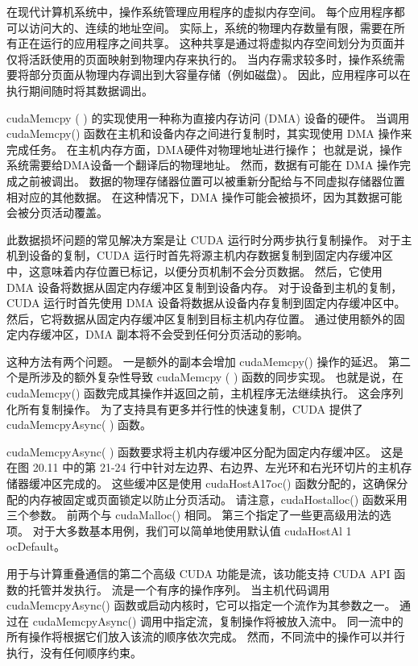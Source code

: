 在现代计算机系统中，操作系统管理应用程序的虚拟内存空间。 每个应用程序都可以访问大的、连续的地址空间。 实际上，系统的物理内存数量有限，需要在所有正在运行的应用程序之间共享。 这种共享是通过将虚拟内存空间划分为页面并仅将活跃使用的页面映射到物理内存来执行的。 当内存需求较多时，操作系统需要将部分页面从物理内存调出到大容量存储（例如磁盘）。 因此，应用程序可以在执行期间随时将其数据调出。

cudaMemcpy ( ) 的实现使用一种称为直接内存访问 (DMA) 设备的硬件。 当调用 cudaMemcpy() 函数在主机和设备内存之间进行复制时，其实现使用 DMA 操作来完成任务。 在主机内存方面，DMA硬件对物理地址进行操作； 也就是说，操作系统需要给DMA设备一个翻译后的物理地址。 然而，数据有可能在 DMA 操作完成之前被调出。 数据的物理存储器位置可以被重新分配给与不同虚拟存储器位置相对应的其他数据。 在这种情况下，DMA 操作可能会被损坏，因为其数据可能会被分页活动覆盖。

此数据损坏问题的常见解决方案是让 CUDA 运行时分两步执行复制操作。 对于主机到设备的复制，CUDA 运行时首先将源主机内存数据复制到固定内存缓冲区中，这意味着内存位置已标记，以便分页机制不会分页数据。 然后，它使用 DMA 设备将数据从固定内存缓冲区复制到设备内存。 对于设备到主机的复制，CUDA 运行时首先使用 DMA 设备将数据从设备内存复制到固定内存缓冲区中。 然后，它将数据从固定内存缓冲区复制到目标主机内存位置。 通过使用额外的固定内存缓冲区，DMA 副本将不会受到任何分页活动的影响。

这种方法有两个问题。 一是额外的副本会增加 cudaMemcpy() 操作的延迟。 第二个是所涉及的额外复杂性导致 cudaMemcpy ( ) 函数的同步实现。 也就是说，在 cudaMemcpy() 函数完成其操作并返回之前，主机程序无法继续执行。 这会序列化所有复制操作。 为了支持具有更多并行性的快速复制，CUDA 提供了 cudaMemcpyAsync( ) 函数。

cudaMemcpyAsync( ) 函数要求将主机内存缓冲区分配为固定内存缓冲区。 这是在图 20.11 中的第 21-24 行中针对左边界、右边界、左光环和右光环切片的主机存储器缓冲区完成的。 这些缓冲区是使用 cudaHostA17oc() 函数分配的，这确保分配的内存被固定或页面锁定以防止分页活动。 请注意，cudaHostalloc() 函数采用三个参数。 前两个与 cudaMalloc() 相同。 第三个指定了一些更高级用法的选项。 对于大多数基本用例，我们可以简单地使用默认值 cudaHostAl 1 ocDefault。

用于与计算重叠通信的第二个高级 CUDA 功能是流，该功能支持 CUDA API 函数的托管并发执行。 流是一个有序的操作序列。 当主机代码调用 cudaMemcpyAsync() 函数或启动内核时，它可以指定一个流作为其参数之一。 通过在 cudaMemcpyAsync() 调用中指定流，复制操作将被放入流中。 同一流中的所有操作将根据它们放入该流的顺序依次完成。 然而，不同流中的操作可以并行执行，没有任何顺序约束。

